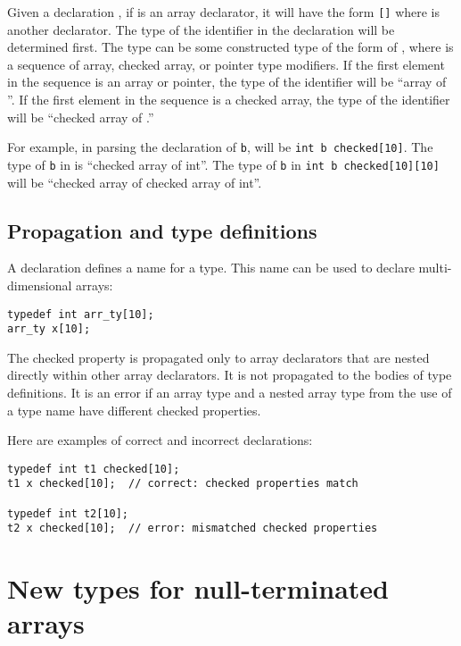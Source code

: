 Given a declaration  , if  is an array
declarator, it will have the form
\lstinline|[|\lstinline|]|
where  is another declarator. The type of the identifier in the
declaration  will be determined first. The type can be some
constructed type of the form  of , where
 is a sequence of array, checked array, or pointer
type modifiers. If the first element in the 
sequence is an array or pointer, the type of the identifier will be
 ``array of  ''. If the first element in the
 sequence is a checked array, the type of the
identifier will be  ``checked array of .''

For example, in parsing the declaration of \lstinline+b+, 
will be \lstinline+int b checked[10]+. The type of \lstinline+b+ in
 is ``checked array of int''. The type of \lstinline+b+ in
\lstinline+int b checked[10][10]+ will be ``checked array of
checked array of int''.

\subsection{Propagation and type definitions}

A  declaration defines a name for a type. This name
can be used to declare multi-dimensional arrays:
\begin{lstlisting}
typedef int arr_ty[10];
arr_ty x[10];
\end{lstlisting}
The checked property is propagated only to array declarators that are 
nested directly within other array declarators.   It is not propagated to
the bodies of type definitions.  It is an error if an array type and a nested 
array type from the use of a type name have different checked properties.

Here are examples of correct and incorrect declarations:
\begin{lstlisting}
typedef int t1 checked[10];
t1 x checked[10];  // correct: checked properties match

typedef int t2[10];
t2 x checked[10];  // error: mismatched checked properties
\end{lstlisting}

\section{New types for null-terminated arrays}
\label{section:nullterm-types}

